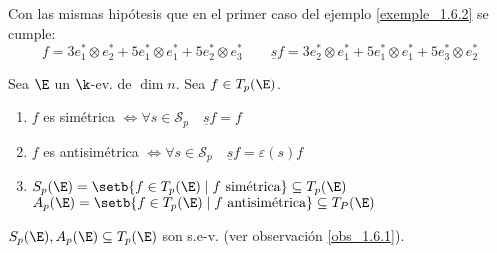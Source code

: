 \begin{example}
    Con las mismas hipótesis que en el primer caso del ejemplo%
    \ref{exemple_1.6.2} se cumple:
    \[
        f = 3e_1^\ast \otimes e_2^\ast + 5e_1^\ast \otimes e_1^\ast + 5e_2^\ast
        \otimes e_3^\ast \qquad \underline{s}f = 3e_2^\ast \otimes e_1^\ast
        + 5e_1^\ast \otimes e_1^\ast + 5e_3^\ast \otimes e_2^\ast
    \]
\end{example}
\begin{defi}
    Sea $ \E $ un $ \k $-ev.  de $ \dim n $.  Sea $ f \in T_p(\E) $.
    \begin{enumerate}
        \item
            $ f $ es simétrica $ \iff \forall s \in \mathcal{S}_p \quad
            \underline{s}f = f $

        \item
            $ f $ es antisimétrica $ \iff \forall s \in \mathcal{S}_p
            \quad \underline{s}f = \varepsilon (s) f $

        \item
            $ S_p(\E) = \setb{f \in T_p(\E) \mid f \text{ simétrica}}
            \subseteq T_p(\E) $\\
            $ A_p(\E) = \setb{f \in T_p(\E) \mid f \text{ antisimétrica}}
            \subseteq T_P(\E) $

    \end{enumerate}
\end{defi}
\begin{obs}
    $ S_p(\E), A_p(\E) \subseteq T_p(\E) $ son s.e-v.  (ver observación
    \ref{obs_1.6.1}).
\end{obs}
